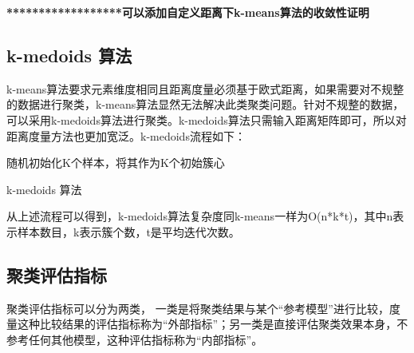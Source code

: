 \textbf{******************可以添加自定义距离下k-means算法的收敛性证明}

\subsection{k-medoids 算法}
k-means算法要求元素维度相同且距离度量必须基于欧式距离，如果需要对不规整的数据进行聚类，k-means算法显然无法解决此类聚类问题。针对不规整的数据，可以采用k-medoids算法进行聚类。k-medoids算法只需输入距离矩阵即可，所以对距离度量方法也更加宽泛。k-medoids流程如下：\\
\begin{algorithm}[H]
	 随机初始化K个样本，将其作为K个初始簇心\;
	 \caption{k-medoids 算法}
\end{algorithm}

从上述流程可以得到，k-medoids算法复杂度同k-means一样为O(n*k*t)，其中n表示样本数目，k表示簇个数，t是平均迭代次数。


\subsection{聚类评估指标}
聚类评估指标可以分为两类，
一类是将聚类结果与某个“参考模型”进行比较，度量这种比较结果的评估指标称为“外部指标”；另一类是直接评估聚类效果本身，不参考任何其他模型，这种评估指标称为“内部指标”。

